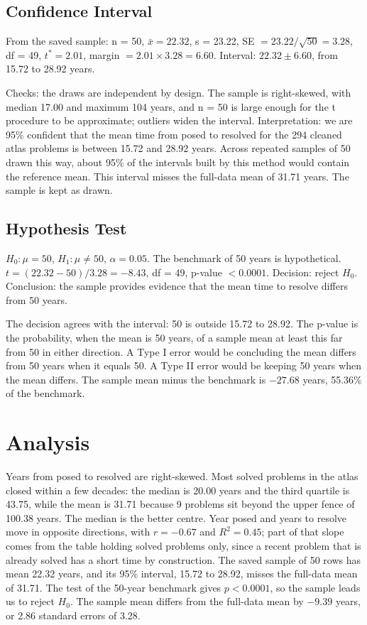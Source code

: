 \documentclass[11pt]{article}
\begin{document}
\subsection{Confidence Interval}

From the saved sample: n = 50, $\bar x = 22.32$, s = 23.22, SE $= 23.22/\sqrt{50} = 3.28$, df = 49, $t^* = 2.01$, margin $= 2.01 \times 3.28 = 6.60$. Interval: $22.32 \pm 6.60$, from 15.72 to 28.92 years.

Checks: the draws are independent by design. The sample is right-skewed, with median 17.00 and maximum 104 years, and n = 50 is large enough for the t procedure to be approximate; outliers widen the interval. Interpretation: we are 95\% confident that the mean time from posed to resolved for the 294 cleaned atlas problems is between 15.72 and 28.92 years. Across repeated samples of 50 drawn this way, about 95\% of the intervals built by this method would contain the reference mean. This interval misses the full-data mean of 31.71 years. The sample is kept as drawn.

\subsection{Hypothesis Test}

$H_0: \mu = 50$, $H_1: \mu \ne 50$, $\alpha = 0.05$. The benchmark of 50 years is hypothetical. $t = (22.32 - 50)/3.28 = -8.43$, df = 49, p-value $< 0.0001$. Decision: reject $H_0$. Conclusion: the sample provides evidence that the mean time to resolve differs from 50 years.

The decision agrees with the interval: 50 is outside 15.72 to 28.92. The p-value is the probability, when the mean is 50 years, of a sample mean at least this far from 50 in either direction. A Type I error would be concluding the mean differs from 50 years when it equals 50. A Type II error would be keeping 50 years when the mean differs. The sample mean minus the benchmark is $-27.68$ years, 55.36\% of the benchmark.

\section*{Analysis}
\noindent{}

\medskip
Years from posed to resolved are right-skewed. Most solved problems in the atlas closed within a few decades: the median is 20.00 years and the third quartile is 43.75, while the mean is 31.71 because 9 problems sit beyond the upper fence of 100.38 years. The median is the better centre. Year posed and years to resolve move in opposite directions, with $r = -0.67$ and $R^2 = 0.45$; part of that slope comes from the table holding solved problems only, since a recent problem that is already solved has a short time by construction. The saved sample of 50 rows has mean 22.32 years, and its 95\% interval, 15.72 to 28.92, misses the full-data mean of 31.71. The test of the 50-year benchmark gives $p < 0.0001$, so the sample leads us to reject $H_0$. The sample mean differs from the full-data mean by $-9.39$ years, or 2.86 standard errors of 3.28.
\end{document}
